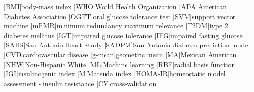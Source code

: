 \begin{acronym}[ABCDEFGHI]
	\setlength{\itemsep}{3pt}
	[BMI]{body-mass index}
	[WHO]{World Health Organization}
	[ADA]{American Diabetes Association}
  [OGTT]{oral glucose tolerance test}
  [SVM]{support vector machine}
  [mRMR]{minimum redundancy maximum relevance}
	[T2DM]{type 2 diabetes mellitus}
	[IGT]{impaired glucose tolerance}
	[IFG]{impaired fasting glucose}
	[SAHS]{San Antonio Heart Study}
	[SADPM]{San Antonio diabetes prediction model}
	[CVD]{cardiovascular disease}
	[g-mean]{geometric mean}
	[MA]{Mexican American}
	[NHW]{Non-Hispanic White}
	[ML]{Machine learning}
	[RBF]{radial basis function}
	[IGI]{insulinogenic index}
	{Matsuda index}
	[HOMA-IR]{homeostatic model assessment - insulin resistance}
	[CV]{cross-validation}
\end{acronym}
